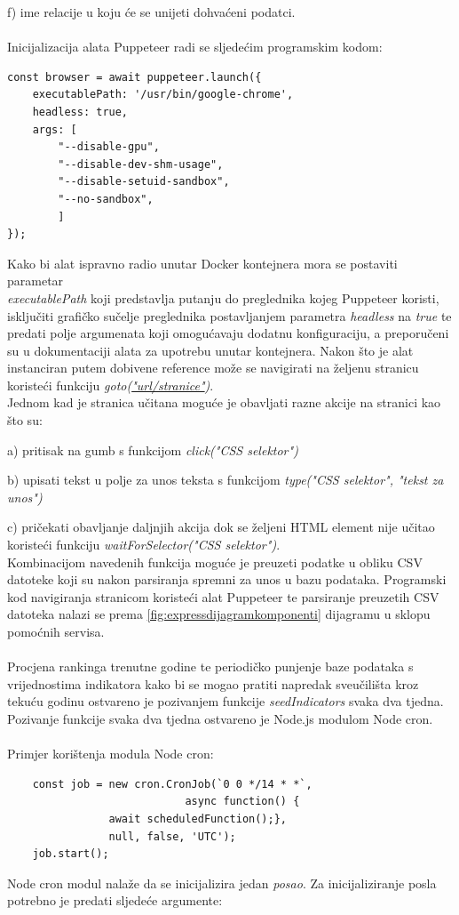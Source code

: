 \documentclass[times, utf8, zavrsni]{fer}
\begin{document}
    f) ime relacije u koju će se unijeti dohvaćeni podatci.
\\\\Inicijalizacija alata Puppeteer radi se sljedećim programskim kodom:
\begin{verbatim}  
const browser = await puppeteer.launch({
    executablePath: '/usr/bin/google-chrome',
    headless: true,
    args: [
        "--disable-gpu",
        "--disable-dev-shm-usage",
        "--disable-setuid-sandbox",
        "--no-sandbox",
        ]
});
\end{verbatim} 
Kako bi alat ispravno radio unutar Docker kontejnera mora se postaviti parametar \\\emph{executablePath} koji predstavlja putanju 
do preglednika kojeg Puppeteer koristi, isključiti grafičko sučelje preglednika postavljanjem parametra \emph{headless} na \emph{true} te predati 
polje argumenata koji omogućavaju dodatnu konfiguraciju, a preporučeni su u dokumentaciji alata za upotrebu unutar kontejnera.
Nakon što je alat instanciran putem dobivene reference može se navigirati na željenu stranicu koristeći funkciju \emph{goto(\url{"url/stranice"})}.
\\Jednom kad je stranica učitana moguće je obavljati razne akcije na stranici kao što su:

    a) pritisak na gumb s funkcijom \emph{click("CSS selektor")}

    b) upisati tekst u polje za unos teksta s funkcijom \emph{type("CSS selektor", "tekst za unos")}

    c) pričekati obavljanje daljnjih akcija dok se željeni HTML element nije učitao koristeći funkciju \emph{waitForSelector("CSS selektor")}.
\\Kombinacijom navedenih funkcija moguće je preuzeti podatke u obliku CSV datoteke koji su nakon parsiranja spremni za unos u bazu podataka.
Programski kod navigiranja stranicom koristeći alat Puppeteer te parsiranje preuzetih CSV datoteka nalazi se prema \ref{fig:expressdijagramkomponenti}
dijagramu u sklopu pomoćnih servisa.
\\\\Procjena rankinga trenutne godine te periodičko punjenje baze podataka s \\vrijednostima indikatora kako bi se mogao pratiti napredak 
sveučilišta kroz tekuću godinu ostvareno je pozivanjem funkcije \emph{seedIndicators} svaka dva tjedna. Pozivanje funkcije svaka dva tjedna 
ostvareno je Node.js modulom Node cron. 
\\\\Primjer korištenja modula Node cron:
\begin{verbatim}  
    const job = new cron.CronJob(`0 0 */14 * *`, 
                            async function() {
                await scheduledFunction();}, 
                null, false, 'UTC');
    job.start();
\end{verbatim}
Node cron modul nalaže da se inicijalizira jedan \emph{posao}. Za inicijaliziranje posla potrebno je predati sljedeće argumente:
\end{document}
